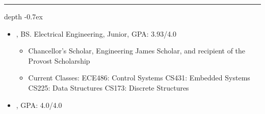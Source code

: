 \documentclass[10pt,letterpaper]{article}
\def\Vhrulefill{\leavevmode\leaders\hrule height 0.7ex depth \dimexpr0.4pt-0.7ex\hfill\kern0pt}
\begin{document}
%
%


\vspace{-.78mm}
\noindent \large{}  \Vhrulefill
\vspace{-.7mm}


\begin{itemize}[label={}]
 \item \small{, BS. Electrical Engineering, Junior, GPA: 3.93/4.0 \hfill {}}
 \vspace{-1.58mm}
 \begin{itemize}[label={}]
 	\item \small{Chancellor's Scholar, Engineering James Scholar, and recipient of the Provost Scholarship}
 	\item \small{Current Classes: \hspace{3mm} ECE486: Control Systems \hspace{3mm} CS431: Embedded Systems \hspace{3mm} CS225: Data Structures \hspace{3mm} CS173: Discrete Structures}
 \end{itemize}





 \item \small{, GPA: 4.0/4.0 \hfill {}}

\end{itemize}
\end{document}
